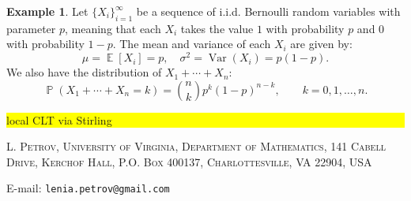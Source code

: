 \documentclass[letterpaper,11pt,oneside,reqno]{article}
\numberwithin{equation}{section}
\theoremstyle{definition}
\newtheorem{example}[proposition]{Example}
\begin{document}
\begin{example}
Let $\{X_i\}_{i=1}^{\infty}$ be a sequence of i.i.d. Bernoulli random variables with parameter $p$, meaning that each $X_i$ takes the value $1$ with probability $p$ and $0$ with probability $1 - p$. The mean and variance of each $X_i$ are given by:
\[
	\mu = \operatorname{\mathbb{E}}[X_i] = p, \quad \sigma^2 = \operatorname{\mathrm{Var}}(X_i) = p(1 - p).
\]
We also have the distribution of $X_1+\cdots+X_n$:
\begin{equation*}
	\operatorname{\mathbb{P}}\left( X_1+ \cdots + X_n = k \right) = \binom{n}{k} p^k (1-p)^{n-k},
	\qquad k = 0, 1, \ldots, n.
\end{equation*}

\colorbox{yellow}{\parbox{.7\textwidth}{local CLT via Stirling}}

\end{example}













































\medskip

\textsc{L. Petrov, University of Virginia, Department of Mathematics, 141 Cabell Drive, Kerchof Hall, P.O. Box 400137, Charlottesville, VA 22904, USA}

E-mail: \texttt{lenia.petrov@gmail.com}
\end{document}
